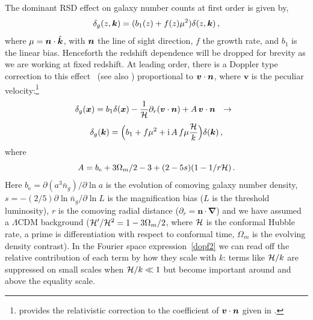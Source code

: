 The dominant RSD effect on galaxy number counts at first order is given by, 
\begin{equation}
    \delta_g(z,\bm {k}) = (b_{1}(z) + f (z) \mu^{2})\delta(z,\bm {k})\,,
\end{equation}
where $\mu=\bm {n}\cdot\hat{\bm {k}}$, with $\bm {n}$ the line of sight direction, $f$ the growth rate, and $b_1$ is the linear bias. Henceforth the redshift dependence will be dropped for brevity as we are working at fixed redshift. At leading order, there is a Doppler type correction to this effect~\citep{Kaiser:1987qv,McDonald:2009dh,Challinor:2011bk} (see also \citep{Raccanelli:2016avd,Hall:2016bmm,Abramo:2017xnp}) proportional to $\bm{v}\cdot\bm {n}$, where $\bm{v}$ is the peculiar velocity:\footnote{\citep{Challinor:2011bk} provides the relativistic correction to the coefficient of $\bm{v}\cdot\bm {n}$ given in \citep{Kaiser:1987qv,McDonald:2009dh}.}
\begin{equation} \label{dopf}
\delta_g(\bm {x}) = b_{1} \delta(\bm {x})-{\frac{1}{\mathcal{H}}}\partial_r(\bm{v}\cdot\bm {n}) +{A}\,\bm{v}\cdot\bm {n} ~~\to~~
\end{equation}
\begin{equation} \delta_g(\bm {k})=\Big(b_1+f\mu^2+\mathrm{i\,} {A}\,f \mu{\frac{\mathcal{H}}{k}}\Big)\delta(\bm {k})\,,\label{dopf2}
\end{equation}
where  
\begin{equation}
{A} = {b_{\textrm{e}}+{3}\Omega_m/2 -3 + (2-5s) (1-{1/ r\mathcal{H}} )}\,.
\end{equation}
Here $b_{\textrm{e}}=\partial (a^3 \bar{n}_g)/\partial \ln a$ is the evolution of comoving galaxy number density, $s=-(2/5)\partial \ln \bar{n}_g/\partial \ln L$ is the magnification bias ($L$ is the threshold luminosity), $r$ is the comoving radial distance ($\partial_r=\bm n\cdot\bm\nabla$) and we have assumed a $\Lambda$CDM background ($\mathcal{H}'/\mathcal{H}^2=1-3\Omega_m/2$, where $\mathcal{H}$ is the conformal Hubble rate, a prime is differentiation with respect to conformal time, $\Omega_m$ is the evolving density contrast). In the  Fourier space expression~\eqref{dopf2} we can read off the relative contribution of each term by how they scale with $k$: terms like $\mathcal{H}/k$ are suppressed on small scales when $\mathcal{H}/k\ll1$ but become important around and above the equality scale. 

